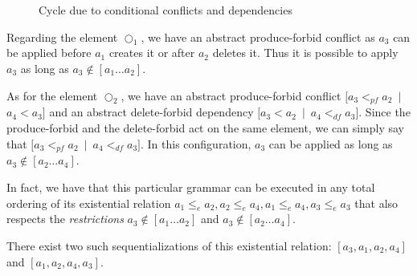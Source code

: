 \begin{example}
\begin{figure}[!ht]
  \centering
  \caption{Cycle due to conditional conflicts and dependencies}\label{fig:process:order:cycle}
\end{figure}

  Regarding the element $\Circle_1$, we have an abstract produce-forbid conflict as $a_3$ can be applied before $a_1$ creates it or after $a_2$ deletes it. Thus it is possible to apply $a_3$ as long as $a_3 \not\in [a_1\ldots a_2]$. %

  As for the element $\Circle_2$, we have an abstract produce-forbid conflict \mbox{$[a_3 <_{pf} a_2$ $|$ $a_4 < a_3]$} and an abstract delete-forbid dependency \mbox{$[a_3 < a_2$ $|$ $a_4 <_{df} a_3]$}. Since the produce-forbid and the delete-forbid act on the same element, we can simply say that \mbox{$[a_3 <_{pf} a_2$ $|$ $a_4 <_{df} a_3]$}. In this configuration, $a_3$ can be applied as long as $a_3 \not\in [a_2\ldots a_4]$.

  In fact, we have that this particular grammar can be executed in any total ordering of its existential relation $a_1 \leq_e a_2, a_2 \leq_e a_4, a_1 \leq_e a_4, a_3 \leq_e a_3$ that also respects the \emph{restrictions} $a_3 \not\in [a_1\ldots a_2]$ and $a_3 \not\in [a_2\ldots a_4]$.

  There exist two such sequentializations of this existential relation: $[a_3, a_1, a_2, a_4]$ and $[a_1,a_2,a_4,a_3]$.
\end{example}

